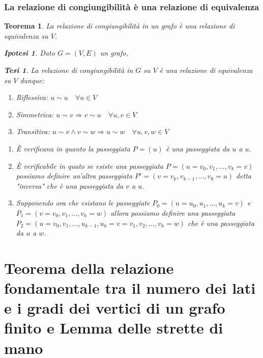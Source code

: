 \documentclass{article}
\makeatletter
\renewenvironment{proof}[1][\proofname]{\par
    \pushQED{\qed}%
    \normalfont \topsep6\p@\@plus6\p@\relax
    \trivlist
    \item\relax
    {\itshape
    #1\@addpunct{.}}\hspace\labelsep\ignorespaces
    }{%
    \popQED\endtrivlist\@endpefalse
}
\newtheorem{theorem}{Teorema}[part]
\newtheorem{ipothesis}[lemma]{Ipotesi}
\newtheorem{thesis}[lemma]{Tesi}
\theoremstyle{definition}
\makeatother
\begin{document}
    \section{La relazione di congiungibilità è una relazione di equivalenza}
        \begin{theorem}
            La relazione di congiungibilità in un grafo è una relazione di equivalenza su \(V\).
            \begin{ipothesis}
                Dato \(G=(V,E)\) un grafo,
            \end{ipothesis}
            \begin{thesis}
                La relazione di congiungibilità in \(G\) su \(V\) è una relazione di equivalenza su \(V\) dunque:
                \begin{enumerate}
                    \item Riflessiva: \(u\sim u\quad \forall u\in V\)
                    \item Simmetrica: \(u\sim v\Rightarrow v\sim u\quad \forall u,v\in V\)
                    \item Transitiva: \(u\sim v\land v\sim w\Rightarrow u\sim w\quad \forall u,v,w\in V\)
                \end{enumerate}
            \end{thesis}
            \begin{proof}
                \begin{enumerate}
                    \item È verificana in quanto la passeggiata \(P=(u)\) è una passeggiata da \(u\) a \(u\).
                    \item È verificabile in quato se esiste una passeggiata \(P=(u=v_0,v_1,\ldots,v_k=v)\) possiamo definire un'altra passeggiata \(P'=(v=v_k,v_{k-1},\ldots,v_0=u)\) detta "inversa" che è una passeggiata da \(v\) a \(u\).
                    \item Supponendo ora che esistano le passeggiate \(P_0=(u=u_0,u_1,\ldots,u_k=v)\) e \(P_1=(v=v_0,v_1,\ldots,v_h=w)\) allora possiamo definire una passeggiata \(P_2=(u=v_0,v_1,\ldots,u_{k-1},u_{k}=v=v_{1},v_{2},\ldots,v_h=w)\) che è una passeggiata da \(u\) a \(w\).
                \end{enumerate}
                \pushQED{}
            \end{proof}
            \raggedleft{{\ensuremath{\blacksquare}}}
        \end{theorem}
\part[Relazione fondamentale dei grafi finiti e Lemma delle strette di mano]{Teorema della relazione fondamentale tra il numero dei lati e i gradi dei vertici di un grafo finito e Lemma delle strette di mano}
\end{document}
